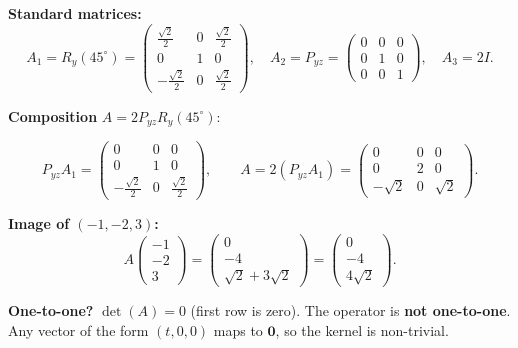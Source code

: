 \documentclass[12pt,a3paper]{article}
\begin{document}
\begin{tcolorbox}[enhanced,breakable,
  colback=cF!4,colframe=cF,boxrule=0.8pt,arc=5pt,
  title={\textbf{Answer --- Composition: Rot$(45^\circ,y)$ $\to$ Project$(yz)$ $\to$ Dilation$(2)$; Image of $(-1,-2,3)$}},
  fonttitle=\bfseries\color{white},colbacktitle=cF]

\textbf{Standard matrices:}
\[
A_1=R_y(45^\circ)=\begin{pmatrix}\frac{\sqrt{2}}{2}&0&\frac{\sqrt{2}}{2}\\0&1&0\\-\frac{\sqrt{2}}{2}&0&\frac{\sqrt{2}}{2}\end{pmatrix},\quad
A_2=P_{yz}=\begin{pmatrix}0&0&0\\0&1&0\\0&0&1\end{pmatrix},\quad
A_3=2I.
\]

\textbf{Composition} $A=2P_{yz}R_y(45^\circ)$:

\[
P_{yz}A_1=\begin{pmatrix}0&0&0\\0&1&0\\-\frac{\sqrt{2}}{2}&0&\frac{\sqrt{2}}{2}\end{pmatrix},
\qquad
A=2(P_{yz}A_1)=\begin{pmatrix}0&0&0\\0&2&0\\-\sqrt{2}&0&\sqrt{2}\end{pmatrix}.
\]

\textbf{Image of $(-1,-2,3)$:}
\[
A\begin{pmatrix}-1\\-2\\3\end{pmatrix}=\begin{pmatrix}0\\-4\\\sqrt{2}+3\sqrt{2}\end{pmatrix}=\begin{pmatrix}0\\-4\\4\sqrt{2}\end{pmatrix}.
\]

\textbf{One-to-one?} $\det(A)=0$ (first row is zero). The operator is \textbf{not one-to-one}. Any vector of the form $(t,0,0)$ maps to $\mathbf{0}$, so the kernel is non-trivial.

\end{tcolorbox}
\end{document}
